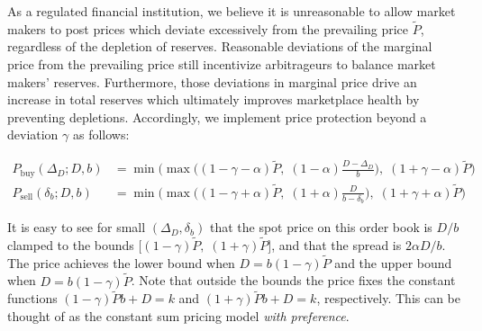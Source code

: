 \documentclass{article}
\begin{document}
As a regulated financial institution, we believe it is unreasonable to allow market makers to post prices which deviate excessively from the prevailing price $\tilde{P}$, regardless of the depletion of reserves. Reasonable deviations of the marginal price from the prevailing price still incentivize arbitrageurs to balance market makers' reserves. Furthermore, those deviations in marginal price drive an increase in total reserves which ultimately improves marketplace health by preventing depletions. Accordingly, we implement price protection beyond a deviation $\gamma$ as follows:

\begin{equation}
\begin{split}
P_{\mathrm{buy}}(\Delta_D; D, b) &= \min \Big( \max \big( (1 - \gamma - \alpha)\tilde{P}, \; (1 - \alpha) \frac{D - \Delta_D}{b} \big), \; (1 + \gamma - \alpha) \tilde{P} \Big) \\
P_{\mathrm{sell}}(\delta_b; D, b) &= \min \Big( \max \big( (1 - \gamma + \alpha) \tilde{P}, \; (1 + \alpha) \frac{D}{b - \delta_b} \big), \; (1 + \gamma + \alpha)\tilde{P} \Big)
\end{split}
\end{equation}

It is easy to see for small $(\Delta_D, \delta_b)$ that the spot price on this order book is $D/b$ clamped to the bounds $\big[ (1 - \gamma) \tilde{P}, \; (1 + \gamma) \tilde{P} \big]$, and that the spread is $2 \alpha D / b$. The price achieves the lower bound when $D = b (1 - \gamma) \tilde{P}$ and the upper bound when $D = b (1 - \gamma) \tilde{P}$. Note that outside the bounds the price fixes the constant functions $(1 - \gamma) \tilde{P} b + D = k$ and $(1 + \gamma) \tilde{P} b + D = k$, respectively. This can be thought of as the constant sum pricing model \emph{with preference}.


  
\end{document}
